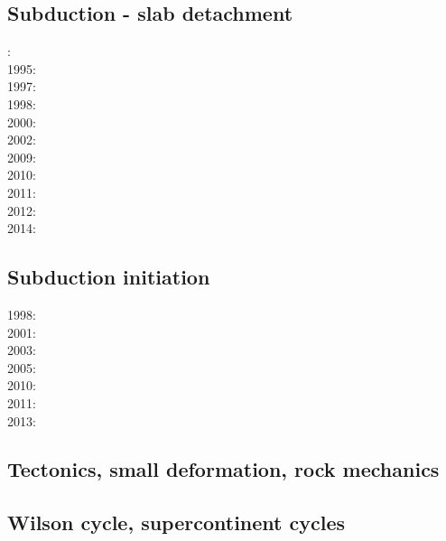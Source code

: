 \subsection*{Subduction - slab detachment}

: \cite{wosp92}\\
1995: \cite{yowo95}\\
1997: \cite{wowo97}\\
1998: \cite{desw98}\\
2000: \cite{wosp00}\\
2002: \cite{bugw02}\\
2009: \cite{anbi09}\cite{bubi09}\\
2010: \cite{bubi10}\\
2011: \cite{dugm11}\\
2012: \cite{dugk12}\cite{dusg12}\\
2014: \cite{dugs14}\cite{besr14}

\subsection*{Subduction initiation}

1998: \cite{togu98}\\
2001: \cite{dohe01}\cite{reyb01}\cite{brry01}\\
2003: \cite{hags03}\\
2005: \cite{bihi05}\\
2010: \cite{nigm10}\cite{bucl10}\\
2011: \cite{bagw11}\\
2013: \cite{dyge13}


\subsection*{Tectonics, small deformation, rock mechanics}

\cite{ilma93}
\cite{hept96}
\cite{lega12}

\subsection*{Wilson cycle, supercontinent cycles}

\cite{trry95}
\cite{zhzl07}
\cite{zhzm09}





